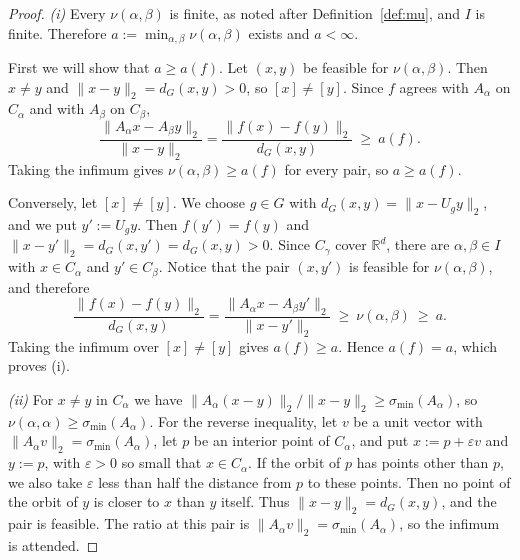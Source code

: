 \documentclass[11pt]{article}
\newcommand{\R}{\mathbb{R}}
\theoremstyle{definition}
\begin{document}
\begin{proof}
	\emph{(i)} Every $\nu(\alpha,\beta)$ is finite, as noted after Definition~\ref{def:mu},
	and $I$ is finite. Therefore $a:=\min_{\alpha,\beta}\nu(\alpha,\beta)$ exists and $a<\infty$.

	First we will show that $a\ge a(f)$. Let $(x,y)$ be feasible for $\nu(\alpha,\beta)$. Then $x\neq y$
	and $\|x-y\|_2=d_{G}(x,y)>0$, so $[x]\neq[y]$. Since $f$ agrees with $A_{\alpha}$ on
	$C_{\alpha}$ and with $A_{\beta}$ on $C_{\beta}$,
	\[
	\frac{\|A_{\alpha}x-A_{\beta}y\|_2}{\|x-y\|_2}=\frac{\|f(x)-f(y)\|_2}{d_{G}(x,y)}\ \ge\ a(f).
	\]
	Taking the infimum gives $\nu(\alpha,\beta)\ge a(f)$ for every pair, so $a\ge a(f)$.

	Conversely, let $[x]\neq[y]$. We choose $g\in G$ with $d_{G}(x,y)=\|x-U_{g}y\|_2$, and we put
	$y':=U_{g}y$. Then $f(y')=f(y)$ and $\|x-y'\|_2=d_{G}(x,y')=d_{G}(x,y)>0$. Since  $C_\gamma$ cover $\R^d$, there are $\alpha,\beta\in I$ with
	$x\in C_{\alpha}$ and $y'\in C_{\beta}$. Notice that the pair $(x,y')$ is feasible for
	$\nu(\alpha,\beta)$, and therefore
	\[
	\frac{\|f(x)-f(y)\|_2}{d_{G}(x,y)}=\frac{\|A_{\alpha}x-A_{\beta}y'\|_2}{\|x-y'\|_2}
	\ \ge\ \nu(\alpha,\beta)\ \ge\ a.
	\]
	Taking the infimum over $[x]\neq[y]$ gives $a(f)\ge a$. Hence $a(f)=a$, which proves (i).

	\emph{(ii)} For $x\neq y$ in $C_{\alpha}$ we have
	$\|A_{\alpha}(x-y)\|_2/\|x-y\|_2\ge\sigma_{\min}(A_{\alpha})$, so
	$\nu(\alpha,\alpha)\ge\sigma_{\min}(A_{\alpha})$. For the reverse inequality, let $v$ be a
	unit vector with $\|A_{\alpha}v\|_2=\sigma_{\min}(A_{\alpha})$, let $p$ be an interior
	point of $C_{\alpha}$, and put $x:=p+\varepsilon v$ and $y:=p$, with $\varepsilon>0$ so
	small that $x\in C_{\alpha}$. If the orbit of $p$ has points other than $p$, we also take $\varepsilon$ less than half the distance from $p$ to these points. Then no point of the orbit of $y$ is closer to $x$ than
	$y$ itself. Thus $\|x-y\|_2=d_{G}(x,y)$, and the pair is feasible. The ratio at this pair is
	$\|A_{\alpha}v\|_2=\sigma_{\min}(A_{\alpha})$, so the infimum is attended.


\end{proof}
\end{document}
